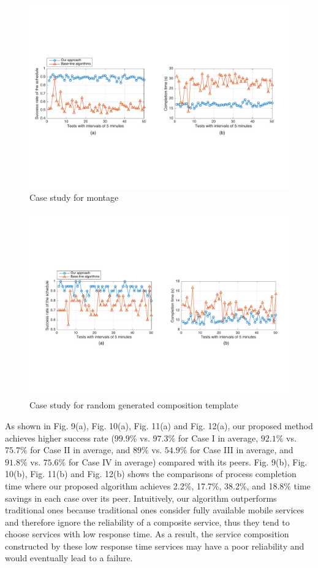 \documentclass[journal]{IEEEtran}
\begin{document}
\begin{figure}[!t]
\centering
\includegraphics[width=6.6in]{./img/Task-24.pdf}
\caption{Case study for montage}
\label{Task-24}
\end{figure}
\begin{figure}[!t]
\centering
\includegraphics[width=6.6in]{./img/Task-12-random.pdf}
\caption{Case study for random generated composition template}
\label{Task-random}
\end{figure}

As shown in Fig. 9(a), Fig. 10(a), Fig. 11(a) and Fig. 12(a), our proposed method achieves higher success rate ($99.9\%$ vs. $97.3\%$ for Case I in average, $92.1\%$ vs. $75.7\%$ for Case II in average, and $89\%$ vs. $54.9\%$ for Case III in average, and $91.8\%$ vs. $75.6\%$ for Case IV in average) compared with its peers.
Fig. 9(b), Fig. 10(b), Fig. 11(b) and Fig. 12(b) shows the comparisons of process completion time where our proposed algorithm achieves 2.2\%, 17.7\%, 38.2\%, and 18.8\% time savings in each case over its peer. 
Intuitively, our algorithm outperforms traditional ones because traditional ones consider fully available mobile services and therefore ignore the reliability of a composite service, thus they tend to choose services with low response time. As a result, the service composition constructed by these low response time services may have a poor reliability and would eventually lead to a failure.
\end{document}
